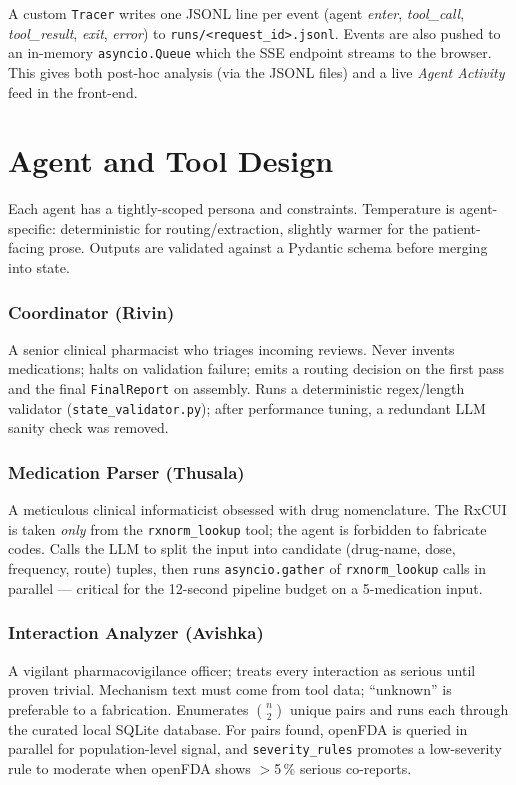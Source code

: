 \documentclass[11pt]{article}
\begin{document}
A custom \texttt{Tracer} writes one JSONL line per event (agent
\textit{enter}, \textit{tool\_call}, \textit{tool\_result},
\textit{exit}, \textit{error}) to \texttt{runs/<request\_id>.jsonl}.
Events are also pushed to an in-memory \texttt{asyncio.Queue} which the
SSE endpoint streams to the browser. This gives both post-hoc analysis
(via the JSONL files) and a live \emph{Agent Activity} feed in the
front-end.

\section*{Agent and Tool Design}\label{agents}

Each agent has a tightly-scoped persona and constraints. Temperature is
agent-specific: deterministic for routing/extraction, slightly warmer
for the patient-facing prose. Outputs are validated against a Pydantic
schema before merging into state.

\subsubsection*{Coordinator (Rivin)}
A senior clinical pharmacist who triages incoming reviews. Never
invents medications; halts on validation failure; emits a routing
decision on the first pass and the final \texttt{FinalReport} on
assembly. Runs a deterministic regex/length validator
(\texttt{state\_validator.py}); after performance tuning, a redundant
LLM sanity check was removed.

\subsubsection*{Medication Parser (Thusala)}
A meticulous clinical informaticist obsessed with drug nomenclature.
The RxCUI is taken \emph{only} from the \texttt{rxnorm\_lookup} tool;
the agent is forbidden to fabricate codes. Calls the LLM to split the
input into candidate (drug-name, dose, frequency, route) tuples, then
runs \texttt{asyncio.gather} of \texttt{rxnorm\_lookup} calls in
parallel — critical for the 12-second pipeline budget on a
5-medication input.

\subsubsection*{Interaction Analyzer (Avishka)}
A vigilant pharmacovigilance officer; treats every interaction as
serious until proven trivial. Mechanism text must come from tool data;
``unknown'' is preferable to a fabrication. Enumerates $\binom{n}{2}$
unique pairs and runs each through the curated local SQLite database.
For pairs found, openFDA is queried in parallel for population-level
signal, and \texttt{severity\_rules} promotes a low-severity rule to
moderate when openFDA shows $>$5\,\% serious co-reports.
\end{document}
